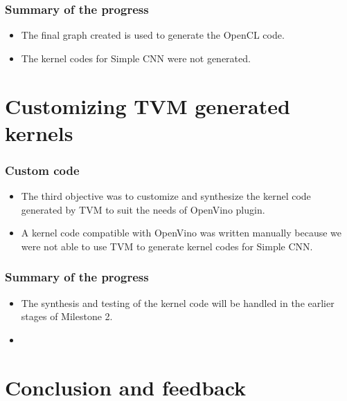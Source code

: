 \documentclass[titlepage]{report}
\begin{document}
\subsection{Summary of the progress}
\begin{itemize}
    \item The final graph created is used to generate the OpenCL code.
    \item The kernel codes for Simple CNN were not generated. 
\end{itemize}

\chapter{ Customizing TVM generated kernels}  

\subsection{Custom code}
\begin{itemize}
    \item The third objective was to customize and synthesize the kernel code generated by TVM to suit the needs of OpenVino plugin.
    \item  A kernel code compatible with OpenVino was written manually because we were not able to use TVM to generate kernel codes for Simple CNN.
    
\end{itemize}
\subsection{Summary of the progress}
\begin{itemize}
\item The synthesis and testing of the kernel code will be handled in the earlier stages of Milestone 2.
\item 

\end{itemize}

\chapter{Conclusion and feedback}
\end{document}
